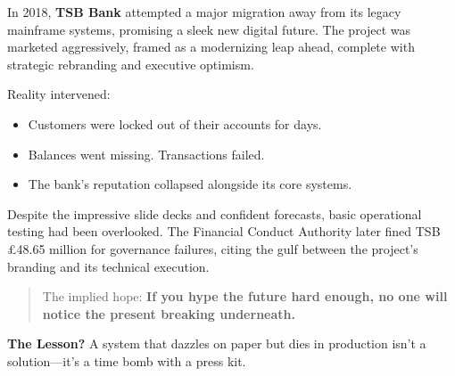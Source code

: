 \begin{tcolorbox}[colback=blue!5!white, colframe=blue!50!black,
  title={Historical Sidebar: When Branding Beats Backtesting --- TSB Bank’s IT Disaster}]

In 2018, \textbf{TSB Bank} attempted a major migration away from its legacy mainframe systems, promising a sleek new digital future.  
The project was marketed aggressively, framed as a modernizing leap ahead, complete with strategic rebranding and executive optimism.

\medskip

Reality intervened:  
\begin{itemize}
    \item Customers were locked out of their accounts for days.
    \item Balances went missing. Transactions failed.
    \item The bank’s reputation collapsed alongside its core systems.
\end{itemize}

\medskip

Despite the impressive slide decks and confident forecasts, basic operational testing had been overlooked.  
The Financial Conduct Authority later fined TSB £48.65 million for governance failures, citing the gulf between the project’s branding and its technical execution.

\medskip

\begin{quote}
The implied hope: \textbf{If you hype the future hard enough, no one will notice the present breaking underneath.}
\end{quote}

\medskip

\textbf{The Lesson?} A system that dazzles on paper but dies in production isn't a solution—it’s a time bomb with a press kit.
\end{tcolorbox}